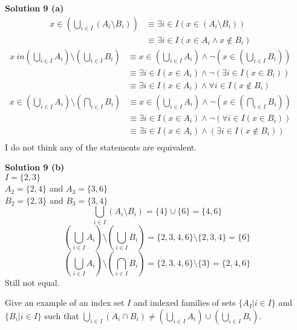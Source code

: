 \textbf{Solution 9 (a)}
\begin{align*}
    x \in \left(\bigcup_{i \in I}(A_i \setminus B_i)\right)
        &\equiv \exists{i \in I}(x \in (A_i \setminus B_i)) && \\
        &\equiv \exists{i \in I}(x \in A_i \wedge x \not \in B_i)
\end{align*}
\begin{align*}
    x\ in \left(\bigcup_{i \in I}A_i\right) \setminus \left(\bigcup_{i \in I} B_i\right)
        &\equiv x \in \left(\bigcup_{i \in I}A_i\right) \wedge \neg\left(x \in \left(\bigcup_{i \in I} B_i\right)\right) && \\
        &\equiv \exists{i \in I}(x \in A_i) \wedge \neg(\exists{i \in I}(x \in B_i)) && \\
        &\equiv \exists{i \in I}(x \in A_i) \wedge \forall{i \in I}(x \not \in B_i) 
\end{align*}
\begin{align*}
    x \in \left(\bigcup_{i \in I}A_i\right) \setminus \left(\bigcap_{i \in I} B_i\right) 
        &\equiv x \in \left(\bigcup_{i \in I} A_i\right) \wedge \neg\left(x \in \left(\bigcap_{i \in I} B_i\right)\right) && \\
        &\equiv \exists{i \in I}(x \in A_i) \wedge \neg\left(\forall{i \in I}(x \in B_i)\right) && \\
        &\equiv \exists{i \in I}(x \in A_i) \wedge \left(\exists{i \in I}(x \not \in B_i)\right) && \\
\end{align*}
I do not think any of the statements are equivalent.

\textbf{Solution 9 (b)}
 \\
$I = \{2, 3\}$ \\
$A_2 = \{2, 4\}$ and $A_3 = \{3, 6\}$ \\
$B_2 = \{2, 3\}$ and $B_3 = \{3, 4\}$ \\
\[\bigcup_{i \in I}(A_i \setminus B_i) = \{4\} \cup \{6\} = \{4, 6\}\]
\[\left(\bigcup_{i \in I} A_i\right) \setminus \left(\bigcup_{i \in I} B_i\right)
    = \{2, 3, 4, 6\} \setminus \{2, 3, 4\} = \{6\}\]
\[\left(\bigcup_{i \in I} A_i\right) \setminus \left(\bigcap_{i \in I} B_i\right)
    = \{2, 3, 4, 6\} \setminus \{3\} = \{2, 4, 6\}\]
Still not equal.

\begin{tcolorbox}[title=Problem 10, breakable]
    Give an example of an index set $I$ and indexed families of sets $\{A_I | i \in I\}$
    and $\{B_i | i \in I\}$ such that 
    $\bigcup_{i \in I}(A_i \cap B_i) \not = (\bigcup_{i \in I} A_i) \cup (\bigcup_{i \in I} B_i)$.
\end{tcolorbox}

